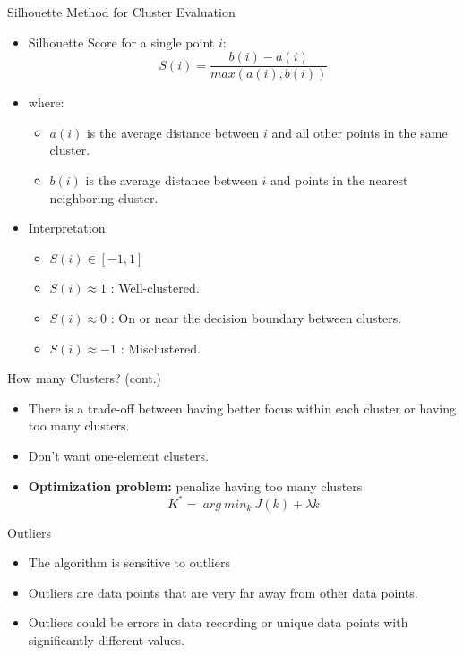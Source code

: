 \documentclass[serif, aspectratio=169]{beamer}
\begin{document}
\begin{frame}{Silhouette Method for Cluster Evaluation}
    \begin{itemize}
        \item Silhouette Score for a single point $i$:
        $$
        S(i) = \frac{b(i)-a(i)}{max(a(i),b(i))}
        $$
        \item where:
        \begin{itemize}
            \item  $a(i)$ is the average distance between $i$ and all other points in the same cluster.
            \item $b(i)$ is the average distance between $i$ and points in the nearest neighboring cluster.
        \end{itemize}
        \item Interpretation:
\begin{itemize}
    \item $ S(i) \in [-1, 1]$
    \item $ S(i) \approx 1$ : Well-clustered.
    \item  $S(i) \approx 0$ : On or near the decision boundary between clusters.
    \item  $S(i) \approx -1$ : Misclustered.
\end{itemize}
    \end{itemize}
\end{frame}

\begin{frame}{How many Clusters? (cont.)}
\begin{itemize}
    \item There is a trade-off between having better focus within each cluster or having too many clusters.
        \item  Don't want one-element clusters.
        \item \textbf{Optimization problem:} penalize having too many clusters
        \[
        K^* = \ arg \ min_k \  J(k) + \lambda k 
        \]
\end{itemize}
    
\end{frame}

\begin{frame}{Outliers}
        \begin{itemize}
    \item The algorithm is sensitive to outliers
            \item Outliers are data points that are very far away from other data points. 
\item Outliers could be errors in data
recording or unique data points
with significantly different
values.
        \end{itemize}
\end{frame}
\end{document}
